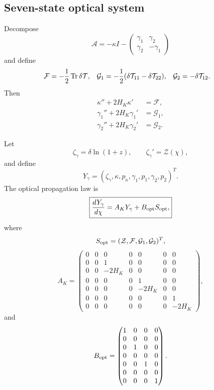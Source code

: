 \subsection{Seven-state optical system}

Decompose
\begin{equation}
\mathcal A
=
-\kappa I
-
\begin{pmatrix}
\gamma_1 & \gamma_2\\
\gamma_2 & -\gamma_1
\end{pmatrix}
\end{equation}
and define
\begin{align}
\mathcal F
&=
-\frac12\,{\rm Tr}\,\delta\mathcal T,
&
\mathcal G_1
&=
-\frac12(\delta\mathcal T_{11}-\delta\mathcal T_{22}),
&
\mathcal G_2
&=
-\delta\mathcal T_{12}.
\end{align}
Then
\begin{align}
\kappa''+2H_K\kappa'&=\mathcal F,\\
\gamma_1''+2H_K\gamma_1'&=\mathcal G_1,\\
\gamma_2''+2H_K\gamma_2'&=\mathcal G_2.
\end{align}

Let
\begin{equation}
\zeta_\gamma=\delta\ln(1+z),
\qquad
\zeta_\gamma'=\mathcal Z(\chi),
\end{equation}
and define
\begin{equation}
Y_\gamma
=
(\zeta_\gamma,\kappa,p_\kappa,\gamma_1,p_1,\gamma_2,p_2)^T.
\end{equation}
The optical propagation law is
\begin{equation}
\boxed{
\frac{dY_\gamma}{d\chi}
=
A_KY_\gamma
+
B_{\rm opt}S_{\rm opt},
}
\label{eq:bhsm-optical-state}
\end{equation}
where
\begin{equation}
S_{\rm opt}=(\mathcal Z,\mathcal F,\mathcal G_1,\mathcal G_2)^T,
\end{equation}
\begin{equation}
A_K
=
\begin{pmatrix}
0&0&0&0&0&0&0\\
0&0&1&0&0&0&0\\
0&0&-2H_K&0&0&0&0\\
0&0&0&0&1&0&0\\
0&0&0&0&-2H_K&0&0\\
0&0&0&0&0&0&1\\
0&0&0&0&0&0&-2H_K
\end{pmatrix},
\end{equation}
and
\begin{equation}
B_{\rm opt}
=
\begin{pmatrix}
1&0&0&0\\
0&0&0&0\\
0&1&0&0\\
0&0&0&0\\
0&0&1&0\\
0&0&0&0\\
0&0&0&1
\end{pmatrix}.
\end{equation}


